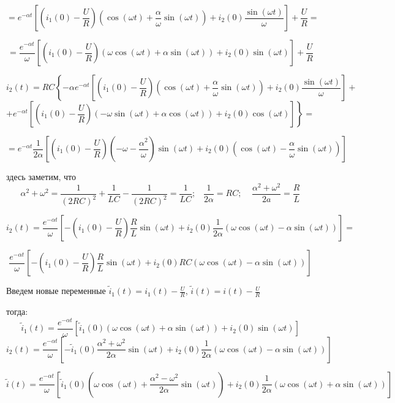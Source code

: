\documentclass[a4paper,12pt]{article}
\begin{document}
$$
= e^{-\alpha t} \left[ \left(i_1(0) - \frac{U}{R}\right)
\left(\cos(\omega t) + \frac{\alpha}{\omega} \sin(\omega t)\right)
+ i_2(0) \frac{\sin(\omega t)}{\omega} \right]  + \frac{U}{R} =
$$

$$
= \frac{e^{-\alpha t}}{\omega} \left[ \left(i_1(0) - \frac{U}{R}\right)
\left(\omega\cos(\omega t) + \alpha \sin(\omega t)\right)
+ i_2(0) \sin(\omega t) \right]  + \frac{U}{R}
$$


$$
i_2(t) = RC\left\{-\alpha e^{-\alpha t} \left[ \left(i_1(0) - \frac{U}{R}\right)
\left(\cos(\omega t) + \frac{\alpha}{\omega} \sin(\omega t)\right)
+ i_2(0) \frac{\sin(\omega t)}{\omega} \right]\right. +
$$
$$
+ \left.e^{-\alpha t} \left[  \left(i_1(0) - \frac{U}{R}\right) 
\left(-\omega\sin(\omega t) + \alpha \cos(\omega t)\right) + i_2(0)\cos(\omega t)
\right]\right\} =
$$

$$
=  e^{-\alpha t} \frac{1}{2\alpha} \left[ \left(i_1(0) - \frac{U}{R}\right)
\left(-\omega - \frac{\alpha^2}{\omega}\right)\sin(\omega t) + 
i_2(0)\left(\cos(\omega t) - \frac{\alpha}{\omega}\sin(\omega t)\right)
\right] 
$$

здесь заметим, что 
$$
\alpha^2 + \omega^2 = \frac{1}{(2RC)^2} + \frac{1}{LC} - \frac{1}{(2RC)^2} = \frac{1}{LC}; \;\;\; 
\frac{1}{2\alpha} = RC; \;\;\;\; \frac{\alpha^2+\omega^2}{2a} = \frac{R}{L}
$$


$$
i_2(t)=\frac{e^{-\alpha t}}{\omega}
\left[ -\left(i_1(0) - \frac{U}{R}\right)\frac{R}{L}\sin(\omega t) 
+ i_2(0) \frac{1}{2\alpha} \left(\omega \cos(\omega t) - \alpha\sin(\omega t)\right)
\right] =
$$

$$
\frac{e^{-\alpha t}}{\omega}
\left[ -\left(i_1(0) - \frac{U}{R}\right)\frac{R}{L}\sin(\omega t)
+ i_2(0) RC \left(\omega \cos(\omega t) - \alpha\sin(\omega t)\right)
\right]
$$

Введем новые переменные ${\displaystyle \tilde{i}_1(t) = i_1(t) - \frac{U}{R}}$,
${\displaystyle \tilde{i}(t) = i(t) - \frac{U}{R}}$

тогда:
$$
\tilde{i}_1(t) = \frac{e^{-\alpha t}}{\omega} \left[ \tilde{i}_1(0) 
\left(\omega\cos(\omega t) + \alpha \sin(\omega t)\right)
+ i_2(0) \sin(\omega t) \right]
$$
$$
i_2(t)=\frac{e^{-\alpha t}}{\omega}
\left[ -\tilde{i}_1(0) \frac{\alpha^2+\omega^2}{2\alpha}\sin(\omega t) +
i_2(0) \frac{1}{2\alpha} \left(\omega \cos(\omega t) - \alpha\sin(\omega t)\right)
\right]
$$

$$
\tilde{i}(t) = \frac{e^{-\alpha t}}{\omega} 
\left[
	\tilde{i}_1(0)\left(\omega\cos(\omega t) + \frac{\alpha^2 - \omega^2}{2\alpha}\sin(\omega t) \right)
+ i_2(0)\frac{1}{2\alpha}\left(\omega\cos(\omega t)  + \alpha\sin(\omega t)\right)
\right]
$$
\end{document}
